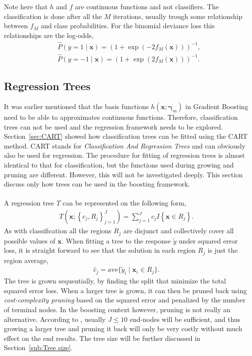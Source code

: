 Note here that $h$ and $f$ are continuous functions and not classifiers. The classification is done after all the $M$ iterations, usually trough some relationship between $f_M$ and class probabilities. For the binomial deviance loss this relationships are the log-odds,
\begin{align}
  \label{eq:boostLogOdds1} 
  &\hat P(y = 1 \mid  \mathbf{x}) = \left( 1+ \exp\left( -2 f_M (\mathbf{x}) \right) \right)^{-1},\\
  \label{eq:boostLogOdds2} 
  &\hat P(y = -1 \mid \mathbf{x}) = \left( 1+ \exp\left( 2 f_M (\mathbf{x}) \right) \right)^{-1}.
\end{align}
\subsection{Regression Trees}
\label{sub:Regression Trees}
It was earlier mentioned that the basis functions $h(\mathbf{x}; \bm{\gamma}_m)$ in Gradient Boosting need to be able to approximates continuous functions. Therefore, classification trees can not be used and the regression framework needs to be explored.
Section~\ref{sec:CART} showed how classification trees can be fitted using the CART method. CART stands for \textit{Classification And Regression Trees} and can obviously also be used for regression. The procedure for fitting of regression trees is almost identical to that for classification, but the functions used during growing and pruning are different. However, this will not be investigated deeply. This section discuss only how trees can be used in the boosting framework.\\
\\
A regression tree $T$ can be represented on the following form,
\begin{align}
  T(\mathbf{x}; \left\{ c_j, R_j \right\}_{j = 1}^J)  = \sum^{J}_{j=1} c_j I\left\{ \mathbf{x} \in R_j \right\}.
\end{align}
As with classification all the regions $R_j$ are disjunct and collectively cover all possible values of $\mathbf{x}$. 
When fitting a tree to the response $\tilde y$ under squared error loss, it is straight forward to see that the solution in each region $R_j$ is just the region average,
\begin{align}
  \hat{c}_j = \mathrm{ave}\{\tilde y_i \mid \mathbf{x}_i \in R_j\}.
\end{align}
The tree is grown sequentially, by finding the split that minimize the total squared error loss. When a larger tree is grown, it can then be pruned back using \textit{cost-complexity pruning} based on the squared error and penalized by the number of terminal nodes. In the boosting context however, pruning is not really an alternative. According to \cite{modstat}, usually $J \leq 10$ end-nodes will be sufficient, and thus growing a larger tree and pruning it back will only be very costly without much effect on the end results. The tree size will be further discussed in Section~\ref{sub:Tree size}.\\
